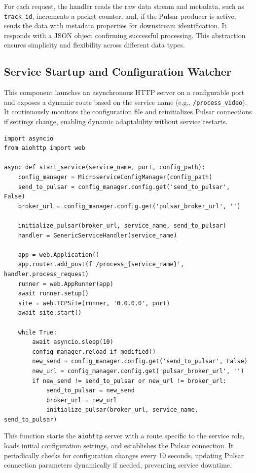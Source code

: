 For each request, the handler reads the raw data stream and metadata, such as \texttt{track\_id}, increments a packet counter, and, if the Pulsar producer is active, sends the data with metadata properties for downstream identification. It responds with a JSON object confirming successful processing. This abstraction ensures simplicity and flexibility across different data types.

\subsection{Service Startup and Configuration Watcher}
This component launches an asynchronous HTTP server on a configurable port and exposes a dynamic route based on the service name (e.g., \texttt{/process\_video}). It continuously monitors the configuration file and reinitializes Pulsar connections if settings change, enabling dynamic adaptability without service restarts.

\begin{lstlisting}
import asyncio
from aiohttp import web

async def start_service(service_name, port, config_path):
    config_manager = MicroserviceConfigManager(config_path)
    send_to_pulsar = config_manager.config.get('send_to_pulsar', False)
    broker_url = config_manager.config.get('pulsar_broker_url', '')

    initialize_pulsar(broker_url, service_name, send_to_pulsar)
    handler = GenericServiceHandler(service_name)

    app = web.Application()
    app.router.add_post(f'/process_{service_name}', handler.process_request)
    runner = web.AppRunner(app)
    await runner.setup()
    site = web.TCPSite(runner, '0.0.0.0', port)
    await site.start()

    while True:
        await asyncio.sleep(10)
        config_manager.reload_if_modified()
        new_send = config_manager.config.get('send_to_pulsar', False)
        new_url = config_manager.config.get('pulsar_broker_url', '')
        if new_send != send_to_pulsar or new_url != broker_url:
            send_to_pulsar = new_send
            broker_url = new_url
            initialize_pulsar(broker_url, service_name, send_to_pulsar)
\end{lstlisting}

This function starts the \texttt{aiohttp} server with a route specific to the service role, loads initial configuration settings, and establishes the Pulsar connection. It periodically checks for configuration changes every 10 seconds, updating Pulsar connection parameters dynamically if needed, preventing service downtime.

